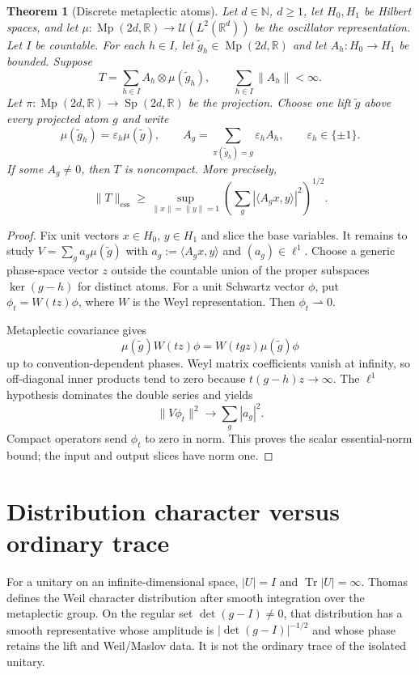 \documentclass[11pt]{article}
\newtheorem{theorem}{Theorem}[section]
\theoremstyle{remark}
\newcommand{\Sp}{\operatorname{Sp}}
\newcommand{\Mp}{\operatorname{Mp}}
\newcommand{\ess}{\mathrm{ess}}
\begin{document}
\begin{theorem}[Discrete metaplectic atoms]\label{thm:atoms}
Let $d\in\mathbb N$, $d\ge1$, let $H_0,H_1$ be Hilbert spaces, and let
$\mu:\Mp(2d,\mathbb R)\to\mathcal U(L^2(\mathbb R^d))$ be the oscillator
representation.  Let $I$ be countable.  For each $h\in I$, let
$\widetilde g_h\in\Mp(2d,\mathbb R)$ and let $A_h:H_0\to H_1$ be bounded.
Suppose
\[
 T=\sum_{h\in I} A_h\otimes\mu(\widetilde g_h),
 \qquad \sum_{h\in I}\|A_h\|<\infty.
\]
Let $\pi:\Mp(2d,\mathbb R)\to\Sp(2d,\mathbb R)$ be the projection.  Choose
one lift $\widetilde g$ above every projected atom $g$ and write
\[
 \mu(\widetilde g_h)=\varepsilon_h\mu(\widetilde g),\qquad
 A_g=\sum_{\pi(\widetilde g_h)=g}\varepsilon_hA_h,
 \qquad \varepsilon_h\in\{\pm1\}.
\]
If some
$A_g\ne0$, then $T$ is noncompact.  More precisely,
\[
 \|T\|_{\ess}\ge
 \sup_{\|x\|=\|y\|=1}
 \left(\sum_g|\langle A_gx,y\rangle|^2\right)^{1/2}.
\]
\end{theorem}

\begin{proof}
Fix unit vectors $x\in H_0$, $y\in H_1$ and slice the base variables.  It
remains to study
$V=\sum_g a_g\mu(\widetilde g)$ with
$a_g:=\langle A_gx,y\rangle$ and $(a_g)\in\ell^1$.  Choose a generic
phase-space vector $z$ outside the countable union of the proper subspaces
$\ker(g-h)$ for distinct atoms.  For a unit Schwartz vector $\phi$, put
$\phi_t=W(tz)\phi$, where $W$ is the Weyl representation.  Then
$\phi_t\rightharpoonup0$.

Metaplectic covariance gives
\[
 \mu(\widetilde g)W(tz)\phi
 =W(tgz)\mu(\widetilde g)\phi
\]
up to convention-dependent phases.  Weyl matrix coefficients vanish at
infinity, so off-diagonal inner products tend to zero because
$t(g-h)z\to\infty$.  The $\ell^1$ hypothesis dominates the double series and
yields
\[
 \|V\phi_t\|^2\longrightarrow\sum_g|a_g|^2.
\]
Compact operators send $\phi_t$ to zero in norm.  This proves the scalar
essential-norm bound; the input and output slices have norm one.
\end{proof}

\section{Distribution character versus ordinary trace}

For a unitary on an infinite-dimensional space, $|U|=I$ and
$\operatorname{Tr}|U|=\infty$.  Thomas \cite{thomas} defines the Weil
character distribution after smooth integration over the metaplectic group.
On the regular set $\det(g-I)\ne0$, that distribution has a smooth
representative whose amplitude is $|\det(g-I)|^{-1/2}$ and whose phase retains
the lift and Weil/Maslov data.  It is not the ordinary trace of the isolated
unitary.
\end{document}
